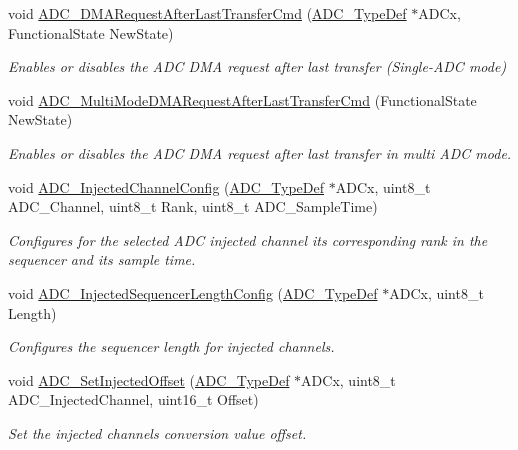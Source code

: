 \begin{DoxyCompactItemize}
void \hyperlink{group___a_d_c_ga912fd3e923ae4435621724e1bbc52729}{A\+D\+C\+\_\+\+D\+M\+A\+Request\+After\+Last\+Transfer\+Cmd} (\hyperlink{struct_a_d_c___type_def}{A\+D\+C\+\_\+\+Type\+Def} $\ast$A\+D\+Cx, Functional\+State New\+State)
\begin{DoxyCompactList}\small\item\em Enables or disables the A\+DC D\+MA request after last transfer (Single-\/\+A\+DC mode) \end{DoxyCompactList}\item 
void \hyperlink{group___a_d_c_ga40f2be2edf2a33fc15f4a5933b562970}{A\+D\+C\+\_\+\+Multi\+Mode\+D\+M\+A\+Request\+After\+Last\+Transfer\+Cmd} (Functional\+State New\+State)
\begin{DoxyCompactList}\small\item\em Enables or disables the A\+DC D\+MA request after last transfer in multi A\+DC mode. \end{DoxyCompactList}\item 
void \hyperlink{group___a_d_c_gae2b44bff080184e1cf6f2cb6b9bb3e59}{A\+D\+C\+\_\+\+Injected\+Channel\+Config} (\hyperlink{struct_a_d_c___type_def}{A\+D\+C\+\_\+\+Type\+Def} $\ast$A\+D\+Cx, uint8\+\_\+t A\+D\+C\+\_\+\+Channel, uint8\+\_\+t Rank, uint8\+\_\+t A\+D\+C\+\_\+\+Sample\+Time)
\begin{DoxyCompactList}\small\item\em Configures for the selected A\+DC injected channel its corresponding rank in the sequencer and its sample time. \end{DoxyCompactList}\item 
void \hyperlink{group___a_d_c_ga24eba90bc3ee955e07659a605011710d}{A\+D\+C\+\_\+\+Injected\+Sequencer\+Length\+Config} (\hyperlink{struct_a_d_c___type_def}{A\+D\+C\+\_\+\+Type\+Def} $\ast$A\+D\+Cx, uint8\+\_\+t Length)
\begin{DoxyCompactList}\small\item\em Configures the sequencer length for injected channels. \end{DoxyCompactList}\item 
void \hyperlink{group___a_d_c_ga07a942613088ab3ecfc3d97a20475920}{A\+D\+C\+\_\+\+Set\+Injected\+Offset} (\hyperlink{struct_a_d_c___type_def}{A\+D\+C\+\_\+\+Type\+Def} $\ast$A\+D\+Cx, uint8\+\_\+t A\+D\+C\+\_\+\+Injected\+Channel, uint16\+\_\+t Offset)
\begin{DoxyCompactList}\small\item\em Set the injected channels conversion value offset. \end{DoxyCompactList}\item 

\end{DoxyCompactItemize}
